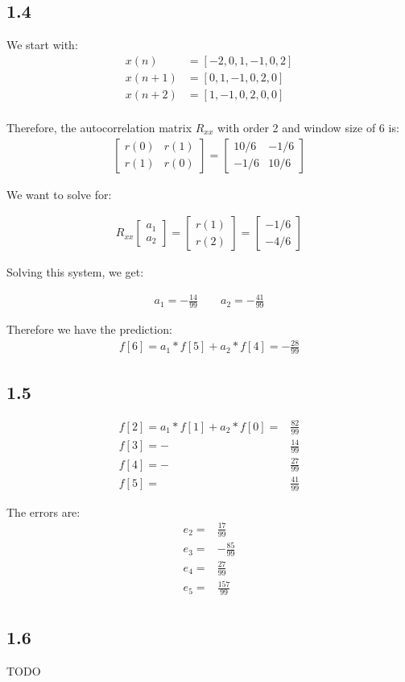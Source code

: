 \documentclass[12pt]{article}
\begin{document}
\subsection*{1.4}
We start with:
\begin{align*}
x(n) &= [-2, 0, 1, -1, 0, 2]\\
x(n+1) &= [0, 1, -1, 0, 2, 0]\\
x(n+2) &= [1, -1, 0, 2, 0, 0]\\
\end{align*}

Therefore, the autocorrelation matrix $R_{xx}$ with order 2 and window size of 6 is:
\begin{align*}
\begin{bmatrix}
r(0) & r(1) \\
r(1) & r(0)
\end{bmatrix}
= \begin{bmatrix}
10/6 & -1/6 \\
-1/6 & 10/6
\end{bmatrix}
\end{align*}

We want to solve for:

\begin{align*}
R_{xx}
\begin{bmatrix}
a_1 \\
a_2
\end{bmatrix}
=
\begin{bmatrix}
r(1)\\
r(2)
\end{bmatrix}
=
\begin{bmatrix}
-1/6 \\
-4/6
\end{bmatrix}
\end{align*}

Solving this system, we get:

\begin{align*}
a_1 = -\frac{14}{99} \qquad a_2 = -\frac{41}{99}
\end{align*}

Therefore we have the prediction:
\begin{align*}
f[6] = a_1 * f[5] + a_2 * f[4] = -\frac{28}{99}
\end{align*}


\subsection*{1.5}
\begin{align*}
f[2] = a_1 * f[1] + a_2 * f[0] = &\frac{82}{99} \\
f[3] = -&\frac{14}{99} \\
f[4] = -&\frac{27}{99} \\
f[5] = &\frac{41}{99}
\end{align*}

The errors are:\\
\begin{align*}
e_2 =  &\frac{17}{99}\\
e_3 = &-\frac{85}{99}\\
e_4 =&  \frac{27}{99}\\
e_5 =& \frac{157}{99}\\
\end{align*}

\subsection*{1.6}
TODO
\end{document}

